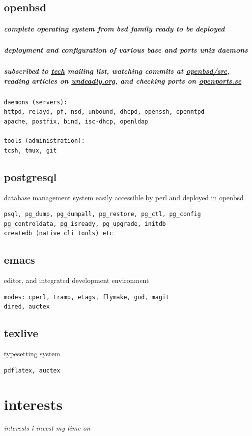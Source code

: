 \documentclass{article}
\begin{document}
    \subsection{openbsd}
      \subparagraph{complete operating system from bsd family ready to be deployed}
      \subparagraph{deployment and configuration of various base and ports unix daemons}
      \subparagraph{subscribed to \href{https://www.openbsd.org/mail.html}{tech} mailing list, watching commits at \href{https://github.com/openbsd/src}{openbsd/src}, reading articles on \href{https://undeadly.org//}{undeadly.org}, and checking ports on \href{https://openports.se/}{openports.se}}
      \begin{verbatim}
daemons (servers):
httpd, relayd, pf, nsd, unbound, dhcpd, openssh, openntpd
apache, postfix, bind, isc-dhcp, openldap

tools (administration):
tcsh, tmux, git
   \end{verbatim}
    \subsection{postgresql}
      database management system easily accessible by perl and deployed in openbsd
      \begin{verbatim}
psql, pg_dump, pg_dumpall, pg_restore, pg_ctl, pg_config
pg_controldata, pg_isready, pg_upgrade, initdb
createdb (native cli tools) etc
  \end{verbatim}
    \subsection{emacs}
    editor, and integrated development environment
      \begin{verbatim}
modes: cperl, tramp, etags, flymake, gud, magit
dired, auctex
   \end{verbatim}
    \subsection{texlive}
    typesetting system
      \begin{verbatim}
pdflatex, auctex
   \end{verbatim}

  \section{interests}
  \textit{interests i invest my time on}
\end{document}
